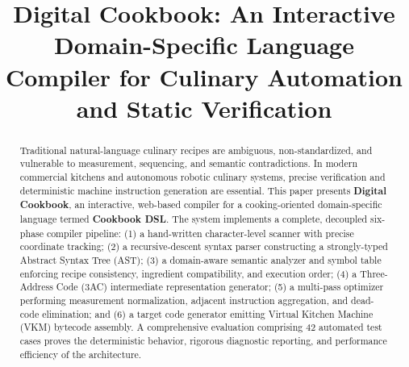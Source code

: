 \documentclass[conference]{IEEEtran}
\begin{document}
\title{Digital Cookbook: An Interactive Domain-Specific Language Compiler for Culinary Automation and Static Verification}

\author{
\and
{}
\and
{}
\and
{}
}

\maketitle

\begin{abstract}
Traditional natural-language culinary recipes are ambiguous, non-standardized, and vulnerable to measurement, sequencing, and semantic contradictions. In modern commercial kitchens and autonomous robotic culinary systems, precise verification and deterministic machine instruction generation are essential. This paper presents \textbf{Digital Cookbook}, an interactive, web-based compiler for a cooking-oriented domain-specific language termed \textbf{Cookbook DSL}. The system implements a complete, decoupled six-phase compiler pipeline: (1) a hand-written character-level scanner with precise coordinate tracking; (2) a recursive-descent syntax parser constructing a strongly-typed Abstract Syntax Tree (AST); (3) a domain-aware semantic analyzer and symbol table enforcing recipe consistency, ingredient compatibility, and execution order; (4) a Three-Address Code (3AC) intermediate representation generator; (5) a multi-pass optimizer performing measurement normalization, adjacent instruction aggregation, and dead-code elimination; and (6) a target code generator emitting Virtual Kitchen Machine (VKM) bytecode assembly. A comprehensive evaluation comprising 42 automated test cases proves the deterministic behavior, rigorous diagnostic reporting, and performance efficiency of the architecture.
\end{abstract}
\end{document}
